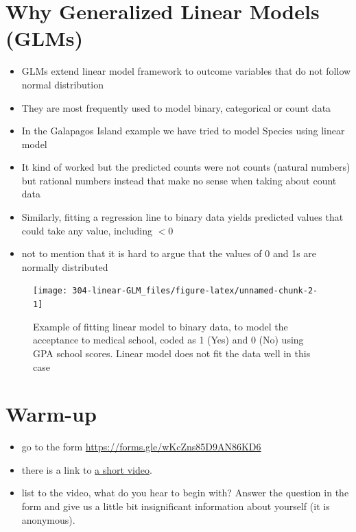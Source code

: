 \documentclass[
]{book}
\providecommand{\tightlist}{%
  \setlength{\itemsep}{0pt}\setlength{\parskip}{0pt}}
\theoremstyle{definition}
\theoremstyle{definition}
\theoremstyle{definition}
\theoremstyle{remark}
\begin{document}
\hypertarget{why-generalized-linear-models-glms}{%
\section{Why Generalized Linear Models (GLMs)}\label{why-generalized-linear-models-glms}}

\begin{itemize}
\tightlist
\item
  GLMs extend linear model framework to outcome variables that do not follow normal distribution
\item
  They are most frequently used to model binary, categorical or count data
\item
  In the Galapagos Island example we have tried to model Species using linear model
\item
  It kind of worked but the predicted counts were not counts (natural numbers) but rational numbers instead that make no sense when taking about count data
\item
  Similarly, fitting a regression line to binary data yields predicted values that could take any value, including \(<0\)
\item
  not to mention that it is hard to argue that the values of 0 and 1s are normally distributed
\end{itemize}

\begin{figure}

{\centering \texttt{[image: 304-linear-GLM\_files/figure-latex/unnamed-chunk-2-1]} 

}

\caption{Example of fitting linear model to binary data, to model the acceptance to medical school, coded as 1 (Yes) and 0 (No) using GPA school scores. Linear model does not fit the data well in this case}\label{fig:unnamed-chunk-2}
\end{figure}

\hypertarget{warm-up}{%
\section{Warm-up}\label{warm-up}}

\begin{itemize}
\tightlist
\item
  go to the form
  \url{https://forms.gle/wKcZns85D9AN86KD6}
\item
  there is a link to \href{https://www.theguardian.com/global/video/2018/may/16/what-do-you-hear-in-this-audio-clip-yanny-or-laurel-takes-internet-by-storm-video}{a short video}.
\item
  list to the video, what do you hear to begin with? Answer the question in the form and give us a little bit insignificant information about yourself (it is anonymous).
\end{itemize}
\end{document}
